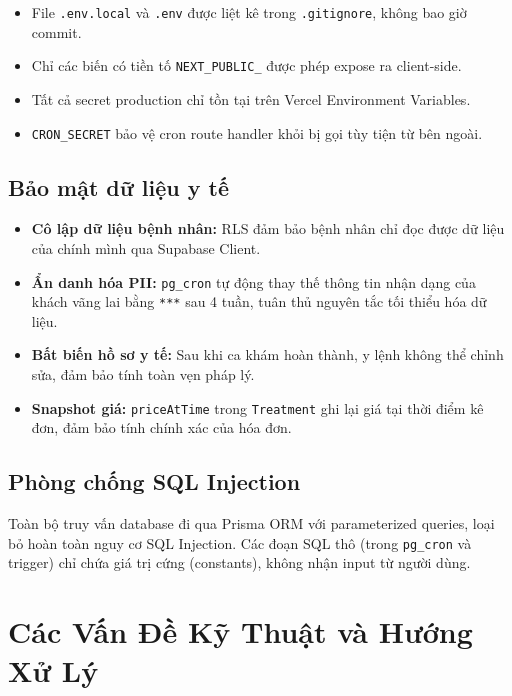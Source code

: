 \documentclass[14pt,a4paper]{report}
\begin{document}
\begin{itemize}
    \item File \texttt{.env.local} và \texttt{.env} được liệt kê
          trong \texttt{.gitignore}, không bao giờ commit.
    \item Chỉ các biến có tiền tố \texttt{NEXT\_PUBLIC\_} được phép
          expose ra client-side.
    \item Tất cả secret production chỉ tồn tại trên Vercel Environment
          Variables.
    \item \texttt{CRON\_SECRET} bảo vệ cron route handler khỏi bị
          gọi tùy tiện từ bên ngoài.
\end{itemize}

\subsection{Bảo mật dữ liệu y tế}

\begin{itemize}
    \item \textbf{Cô lập dữ liệu bệnh nhân:} RLS đảm bảo bệnh nhân
          chỉ đọc được dữ liệu của chính mình qua Supabase Client.
    \item \textbf{Ẩn danh hóa PII:} \texttt{pg\_cron} tự động thay
          thế thông tin nhận dạng của khách vãng lai bằng \texttt{***}
          sau 4 tuần, tuân thủ nguyên tắc tối thiểu hóa dữ liệu.
    \item \textbf{Bất biến hồ sơ y tế:} Sau khi ca khám hoàn thành,
          y lệnh không thể chỉnh sửa, đảm bảo tính toàn vẹn pháp lý.
    \item \textbf{Snapshot giá:} \texttt{priceAtTime} trong
          \texttt{Treatment} ghi lại giá tại thời điểm kê đơn, đảm
          bảo tính chính xác của hóa đơn.
\end{itemize}

\subsection{Phòng chống SQL Injection}

Toàn bộ truy vấn database đi qua Prisma ORM với parameterized queries,
loại bỏ hoàn toàn nguy cơ SQL Injection. Các đoạn SQL thô (trong
\texttt{pg\_cron} và trigger) chỉ chứa giá trị cứng (constants),
không nhận input từ người dùng.

\section{Các Vấn Đề Kỹ Thuật và Hướng Xử Lý}
\end{document}
